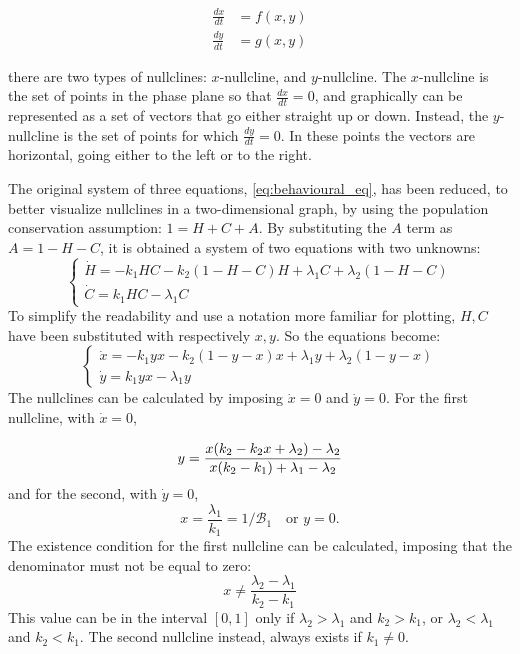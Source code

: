 \begin{align}
	\frac{dx}{dt} &= f(x,y) \\
	\frac{dy}{dt} &= g(x,y)
\end{align}

there are two types of nullclines: $x$-nullcline, and $y$-nullcline. The $x$-nullcline is the set of points in the phase plane so that $\frac{dx}{dt} =0$, and graphically can be represented as a set of vectors that go either straight up or down. Instead, the $y$-nullcline is the set of points for which $\frac{dy}{dt} =0$. In these points the vectors are horizontal, going either to the left or to the right.

The original system of three equations, \eqref{eq:behavioural_eq}, has been reduced, to better visualize nullclines in a two-dimensional graph, by using the population conservation assumption: $1 = H + C + A$. By substituting the $A$ term as $A = 1 - H- C$, it is obtained a system of two equations with two unknowns:
\[
\begin{cases}
	\dot{H} = -k_1 H C - k_2 (1-H-C) H + \lambda_1 C + \lambda_2 (1-H-C)\\
	\dot{C} = k_1 H C - \lambda_1 C
\end{cases}
\]
To simplify the readability and use a notation more familiar for plotting,  $H, C$ have been substituted with respectively $x, y$. So the equations become:
\begin{equation}
\label{eq:system_nullclines}
\begin{cases}
	\dot{x} = -k_1 y x - k_2 (1-y-x) x + \lambda_1 y + \lambda_2 (1-y-x)\\
	\dot{y} = k_1 y x - \lambda_1 y
\end{cases}
\end{equation}
The nullclines can be calculated by imposing $\dot{x} = 0$ and $\dot{y} = 0$. For the first nullcline, with $\dot{x} = 0$,

\begin{equation}\\
\label{eq:x_nullcline}
 y = \frac{x(k_2 - k_2 x + \lambda_2) - \lambda_2}{x(k_2 - k_1)+ \lambda_1- \lambda_2}
\end{equation}
and for the second, with $\dot{y} = 0$,
\[x = \frac{\lambda_1}{k_1} = 1/\mathcal{B}_1 \quad \text{or } y = 0.
\]
The existence condition for the first nullcline can be calculated, imposing that the denominator must not be equal to zero:
\[ x \neq \frac{\lambda_2-\lambda_1}{k_2 - k_1} \]
This value can be in the interval $[0,1]$ only if $\lambda_2>\lambda_1$ and $k_2 > k_1$, or $\lambda_2<\lambda_1$ and $k_2 < k_1$. The second nullcline instead, always exists if $k_1 \neq 0$.

